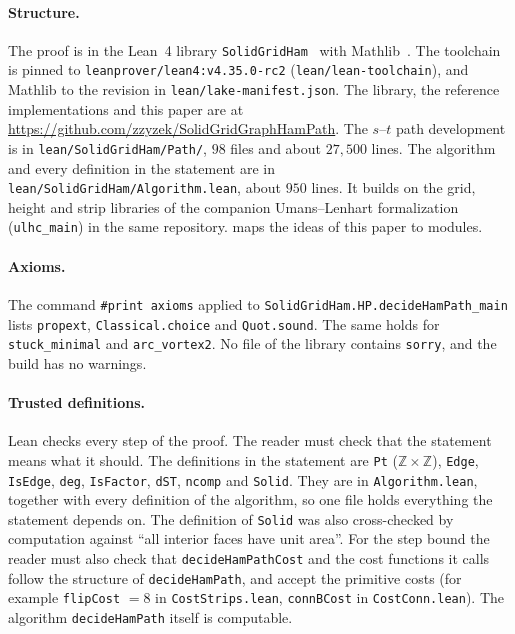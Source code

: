 \documentclass[11pt]{article}
\theoremstyle{plain}
\theoremstyle{definition}
\theoremstyle{remark}
\newcommand{\Z}{\mathbb{Z}}
\newcommand{\lean}[1]{\texttt{#1}}
\begin{document}
\paragraph{Structure.}
The proof is in the Lean~4 library \lean{SolidGridHam}~\cite{lean4} with Mathlib~\cite{mathlib2020}.
The toolchain is pinned to \lean{leanprover/lean4:v4.35.0-rc2} (\lean{lean/lean-toolchain}), and
Mathlib to the revision in \lean{lean/lake-manifest.json}.
The library, the reference implementations and this paper are at
\url{https://github.com/zzyzek/SolidGridGraphHamPath}.
The $s$--$t$ path development is in \lean{lean/SolidGridHam/Path/}, $98$ files and about $27{,}500$
lines.
The algorithm and every definition in the statement are in \lean{lean/SolidGridHam/Algorithm.lean},
about $950$ lines.
It builds on the grid, height and strip libraries of the companion Umans--Lenhart formalization
(\lean{ulhc\_main}) in the same repository.
 maps the ideas of this paper to modules.

\paragraph{Axioms.}
The command \lean{\#print axioms} applied to
\lean{SolidGridHam.HP.decideHamPath\_main} lists \lean{propext}, \lean{Classical.choice} and
\lean{Quot.sound}.
The same holds for \lean{stuck\_minimal} and \lean{arc\_vortex2}.
No file of the library contains \lean{sorry}, and the build has no warnings.

\paragraph{Trusted definitions.}
Lean checks every step of the proof.
The reader must check that the statement means what it should.
The definitions in the statement are \lean{Pt} ($\Z\times\Z$), \lean{Edge}, \lean{IsEdge},
\lean{deg}, \lean{IsFactor}, \lean{dST}, \lean{ncomp} and \lean{Solid}.
They are in \lean{Algorithm.lean}, together with every definition of the algorithm, so one file holds
everything the statement depends on.
The definition of \lean{Solid} was also cross-checked by computation against ``all interior faces
have unit area''.
For the step bound the reader must also check that \lean{decideHamPathCost} and the cost functions it calls
follow the structure of \lean{decideHamPath}, and accept the primitive costs (for example \lean{flipCost}
$=8$ in \lean{CostStrips.lean}, \lean{connBCost} in \lean{CostConn.lean}).
The algorithm \lean{decideHamPath} itself is computable.
\end{document}
